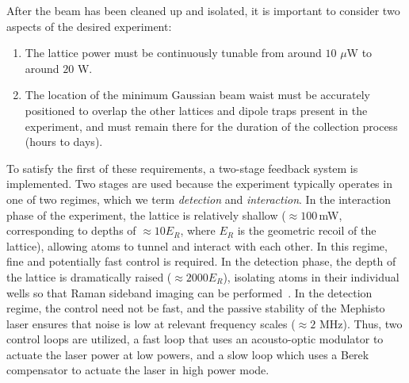 \documentclass[twocolumn,aps,pra,showpacs,preprintnumbers,bibnotes]{revtex4-1}
\begin{document}
After the beam has been cleaned up and isolated, it is important to consider two aspects of the desired experiment: 
\begin{enumerate}
\item The lattice power must be continuously tunable from around $10$ $\mu$W to around $20$ W. 
\item The location of the minimum Gaussian beam waist must be accurately positioned to overlap the other lattices and dipole traps present in the experiment, and must remain there for the duration of the collection process (hours to days).
\end{enumerate}
To satisfy the first of these requirements, a two-stage feedback system is implemented. 
Two stages are used because the experiment typically operates in one of two regimes, which we term \textit{detection} and \textit{interaction}. 
In the interaction phase of the experiment, the lattice is relatively shallow ($\approx 100\,$mW, corresponding to depths of $\approx 10 E_R$, where $E_R$ is the geometric recoil of the lattice), allowing atoms to tunnel and interact with each other. 
In this regime, fine and potentially fast control is required.
In the detection phase, the depth of the lattice is dramatically raised ($\approx 2000 E_R$), isolating atoms in their individual wells so that Raman sideband imaging can be performed~\cite{Parsons2015}.
In the detection regime, the control need not be fast, and the passive stability of the Mephisto laser ensures that noise is low at relevant frequency scales ($\approx 2$ MHz).
Thus, two control loops are utilized, a fast loop that uses an acousto-optic modulator to actuate the laser power at low powers, and a slow loop which uses a Berek compensator to actuate the laser in high power mode.
\end{document}
